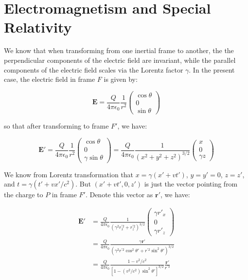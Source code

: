 \documentclass[12pt]{article}
\begin{document}



\pagebreak
\section*{Electromagnetism and Special Relativity}



We know that when transforming from one inertial frame to another, the the perpendicular components of the electric field are invariant, while the parallel components of the electric field scales via the Lorentz factor $\gamma$. In the present case, the electric field in frame $F$ is given by:

\begin{equation}
    \mathbf{E} = \frac{Q}{4\pi\epsilon_0}\frac{1}{r^{2}} \begin{pmatrix} \cos{\theta} \\ 0 \\ \sin{\theta} \end{pmatrix}
\end{equation}

so that after transforming to frame $F'$, we have:

\begin{equation}
    \mathbf{E}' = \frac{Q}{4\pi\epsilon_0}\frac{1}{r^{2}} \begin{pmatrix} \cos{\theta} \\ 0 \\ \gamma\sin{\theta} \end{pmatrix} = \frac{Q}{4\pi\epsilon_0}\frac{1}{(x^{2} + y^{2} + z^{2})^{3/2}} \begin{pmatrix} x \\ 0 \\ \gamma z \end{pmatrix}
\end{equation}

We know from Lorentz transformation that $x = \gamma(x' + vt')$, $y = y' = 0$, $z = z'$, and $t = \gamma(t' + vx'/c^{2})$. But $(x' + vt', 0, z')$ is just the vector pointing from the charge to $P$ in frame $F'$. Denote this vector as $\mathbf{r}'$, we have:

\begin{equation}
\begin{split}
    \mathbf{E}' &= \frac{Q}{4\pi\epsilon_0} \frac{1}{(\gamma^{2} r_{x}^{'2} + r_{z}^{'2})^{3/2}} \begin{pmatrix} \gamma r'_{x} \\ 0 \\ \gamma r'_{z} \end{pmatrix} \\
    &= \frac{Q}{4\pi\epsilon_0} \frac{\gamma \mathbf{r}'}{(\gamma^{2} r^{'2} \cos^{2}{\theta'} + r^{'2} \sin^{2}{\theta'})^{3/2}} \\
    &= \frac{Q}{4\pi\epsilon_0} \frac{1 - v^{2}/c^{2}}{[1 - (v^{2}/c^{2}) \sin^{2}{\theta'}]^{3/2}} \frac{\mathbf{r}'}{r^{'3}} \\
\end{split}
\end{equation}
\end{document}
